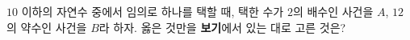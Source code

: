 $10$ 이하의 자연수 중에서 임의로 하나를 택할 때, 택한 수가 $2$의 배수인 사건을 $A$, $12$의 약수인 사건을 $B$라 하자. 옳은 것만을 \textbf{보기}에서 있는 대로 고른 것은? 

